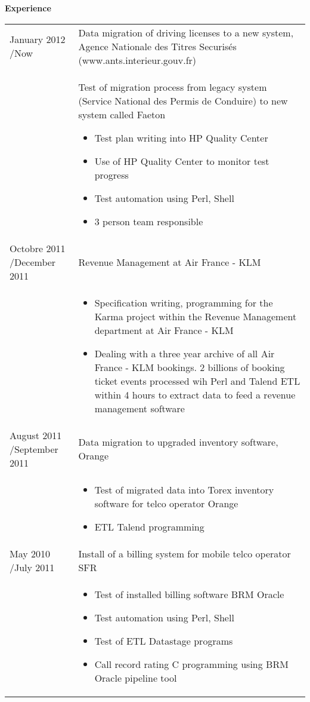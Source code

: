 \documentclass[a4paper,11pt]{letter}
\begin{document}
\textbf{Experience}

\begin{tabular}{p{}p{}}
January 2012 \slash Now & Data migration of driving licenses to a new system, Agence Nationale des Titres Securis\'es (www.ants.interieur.gouv.fr) \\
	

 & Test of migration process from legacy system (Service National des Permis de Conduire) to new system called Faeton 
\begin{itemize}
\item Test plan writing into HP Quality Center
\item Use of HP Quality Center to monitor test progress
\item Test automation using Perl, Shell
\item 3 person team responsible
\end{itemize} \\
	

Octobre 2011 \slash December 2011 & Revenue Management at Air France - KLM \\

& \begin{itemize}
\item Specification writing, programming for the Karma project within the Revenue Management department at Air France - KLM
\item Dealing with a three year archive of all Air France - KLM bookings. 2 billions of booking ticket events processed wih Perl and Talend ETL within 4 hours to extract data to feed a revenue management software
\end{itemize} \\
	

August 2011 \slash September 2011 & Data migration to upgraded inventory software, Orange \\
& \begin{itemize}
\item Test of migrated data into Torex inventory software for telco operator Orange
\item ETL Talend programming
\end{itemize} \\

May 2010 \slash July 2011 & Install of a billing system for mobile telco operator SFR \\
& \begin{itemize}
\item Test of installed billing software BRM Oracle
\item Test automation using Perl, Shell
\item Test of ETL Datastage programs
\item Call record rating C programming using BRM Oracle pipeline tool
\end{itemize} \\
	

\end{tabular}
\end{document}

